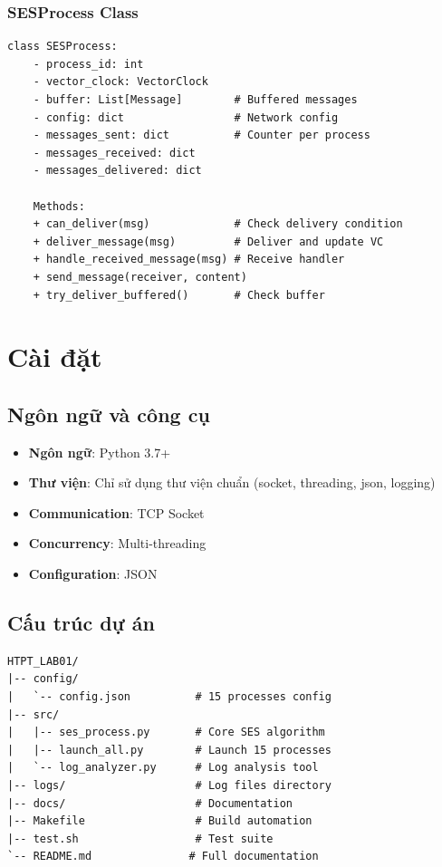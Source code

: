 \subsubsection{SESProcess Class}
\begin{listing}[H]
\begin{verbatim}
class SESProcess:
    - process_id: int
    - vector_clock: VectorClock
    - buffer: List[Message]        # Buffered messages
    - config: dict                 # Network config
    - messages_sent: dict          # Counter per process
    - messages_received: dict
    - messages_delivered: dict
    
    Methods:
    + can_deliver(msg)             # Check delivery condition
    + deliver_message(msg)         # Deliver and update VC
    + handle_received_message(msg) # Receive handler
    + send_message(receiver, content)
    + try_deliver_buffered()       # Check buffer
\end{verbatim}
\caption{SES Process Structure}
\end{listing}

\section{Cài đặt}

\subsection{Ngôn ngữ và công cụ}
\begin{itemize}
    \item \textbf{Ngôn ngữ}: Python 3.7+
    \item \textbf{Thư viện}: Chỉ sử dụng thư viện chuẩn (socket, threading, json, logging)
    \item \textbf{Communication}: TCP Socket
    \item \textbf{Concurrency}: Multi-threading
    \item \textbf{Configuration}: JSON
\end{itemize}

\subsection{Cấu trúc dự án}

\begin{listing}[H]
\begin{verbatim}
HTPT_LAB01/
|-- config/
|   `-- config.json          # 15 processes config
|-- src/
|   |-- ses_process.py       # Core SES algorithm
|   |-- launch_all.py        # Launch 15 processes
|   `-- log_analyzer.py      # Log analysis tool
|-- logs/                    # Log files directory
|-- docs/                    # Documentation
|-- Makefile                 # Build automation
|-- test.sh                  # Test suite
`-- README.md               # Full documentation
\end{verbatim}
\caption{Project Structure}
\end{listing}

